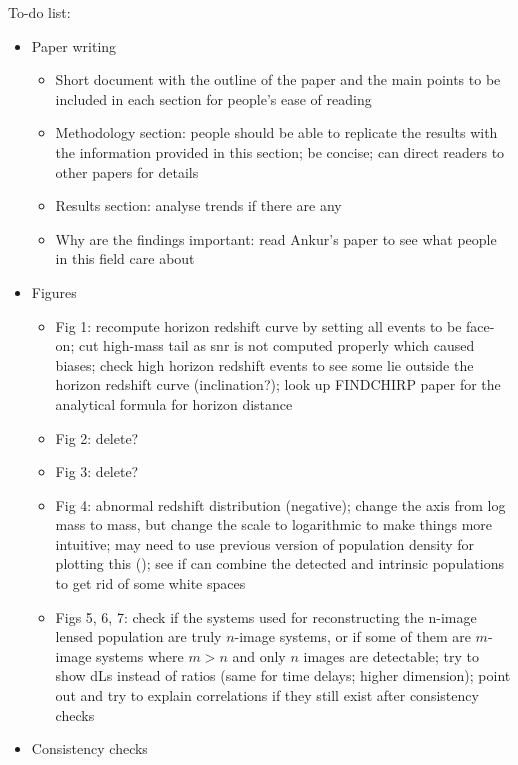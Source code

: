 \documentclass[linenumbers,amsmath,trackchanges]{aastex702}
\begin{document}
To-do list:
\begin{itemize}
    \item Paper writing
    \begin{itemize}
        \item Short document with the outline of the paper and the main points to be included in each 
        section for people's ease of reading
        \item Methodology section: people should be able to replicate the results with the information 
        provided in this section; be concise; can direct readers to other papers for details
        \item Results section: analyse trends if there are any
        \item Why are the findings important: read Ankur's paper to see what people in this field care about
    \end{itemize}
    \item Figures
    \begin{itemize}
        \item Fig 1: recompute horizon redshift curve by setting all events to be face-on; cut high-mass 
        tail as snr is not computed properly which caused biases; check high horizon redshift events to 
        see some lie outside the horizon redshift curve (inclination?); look up FINDCHIRP paper for the 
        analytical formula for horizon distance
        \item Fig 2: delete?
        \item Fig 3: delete?
        \item Fig 4: abnormal redshift distribution (negative); change the axis from log mass to mass, 
        but change the scale to logarithmic to make things more intuitive; may need to use previous 
        version of population density for plotting this (); see if 
        can combine the detected and intrinsic populations to get rid of some white spaces
        \item Figs 5, 6, 7: check if the systems used for reconstructing the n-image lensed population 
        are truly $n$-image systems, or if some of them are $m$-image systems where $m>n$ and only $n$ 
        images are detectable; try to show dLs instead of ratios (same for time delays; higher dimension); 
        point out and try to explain correlations if they still exist after consistency checks
    \end{itemize}
    \item Consistency checks

\end{itemize}
\end{document}
